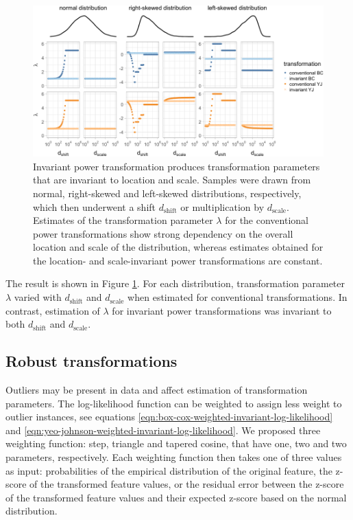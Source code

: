 \documentclass[preprint,12pt,authoryear]{elsarticle}
\begin{document}
\begin{figure}

{\centering \includegraphics[width=1\linewidth]{figure_3} 

}

\caption{Invariant power transformation produces transformation parameters that are invariant to location and scale. Samples were drawn from normal, right-skewed and left-skewed distributions, respectively, which then underwent a shift $d_{\text{shift}}$ or multiplication by $d_{\text{scale}}$. Estimates of the transformation parameter $\lambda$ for the conventional power transformations show strong dependency on the overall location and scale of the distribution, whereas estimates obtained for the location- and scale-invariant power transformations are constant.}\label{fig:shifted-distributions}
\end{figure}

The result is shown in Figure \ref{fig:shifted-distributions}. For each
distribution, transformation parameter \(\lambda\) varied with
\(d_{\text{shift}}\) and \(d_{\text{scale}}\) when estimated for
conventional transformations. In contrast, estimation of \(\lambda\) for
invariant power transformations was invariant to both
\(d_{\text{shift}}\) and \(d_{\text{scale}}\).

\subsection{Robust transformations}\label{robust-transformations}

Outliers may be present in data and affect estimation of transformation
parameters. The log-likelihood function can be weighted to assign less
weight to outlier instances, see equations
\ref{eqn:box-cox-weighted-invariant-log-likelihood} and
\ref{eqn:yeo-johnson-weighted-invariant-log-likelihood}. We proposed
three weighting function: step, triangle and tapered cosine, that have
one, two and two parameters, respectively. Each weighting function then
takes one of three values as input: probabilities of the empirical
distribution of the original feature, the z-score of the transformed
feature values, or the residual error between the z-score of the
transformed feature values and their expected z-score based on the
normal distribution.
\end{document}
